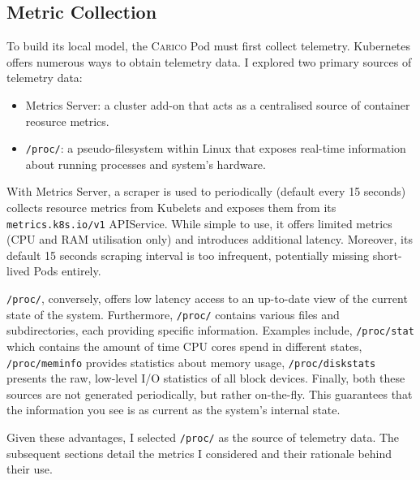\subsection{Metric Collection}
To build its local model, the \textsc{Carico} Pod must first collect telemetry.
Kubernetes offers numerous ways to obtain telemetry data. I explored two primary
sources of telemetry data:
\begin{itemize}
    \item Metrics Server: a cluster add-on that acts as a centralised source of
        container reosurce metrics.
    \item \verb|/proc/|: a pseudo-filesystem within Linux that exposes real-time
        information about running processes and system's hardware.
\end{itemize}

With Metrics Server, a scraper is used to periodically (default every 15
seconds) collects resource metrics from Kubelets and exposes them from its
\verb|metrics.k8s.io/v1| APIService. While simple to use, it offers limited
metrics (CPU and RAM utilisation only) and introduces additional latency.
Moreover, its default 15 seconds scraping interval is too infrequent,
potentially missing short-lived Pods entirely.

\verb|/proc/|, conversely, offers low latency access to an up-to-date view
of the current state of the system. Furthermore, \verb|/proc/| contains various
files and subdirectories, each providing specific information. Examples include,
\verb|/proc/stat| which contains the amount of time CPU cores spend in different
states, \verb|/proc/meminfo| provides statistics about memory usage,
\verb|/proc/diskstats| presents the raw, low-level I/O statistics of all block
devices. Finally, both these sources are not generated periodically, but rather
on-the-fly. This guarantees that the information you see is as current as the
system's internal state.

Given these advantages, I selected \verb|/proc/| as the source of telemetry
data. The subsequent sections detail the metrics I considered and their
rationale behind their use.


